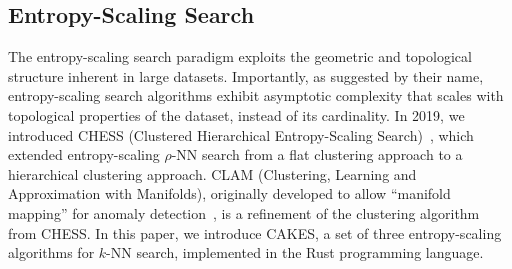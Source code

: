 \subsection{Entropy-Scaling Search}
\label{sec:intoduction:entropy-scaling-search}

The entropy-scaling search paradigm exploits the geometric and topological structure inherent in large datasets.
Importantly, as suggested by their name, entropy-scaling search algorithms exhibit asymptotic complexity that scales with topological properties of the dataset, instead of its cardinality.
In 2019, we introduced CHESS (Clustered Hierarchical Entropy-Scaling Search)~\cite{ishaq2019clustered}, which extended entropy-scaling $\rho$-NN search from a flat clustering approach to a hierarchical clustering approach.
CLAM (Clustering, Learning and Approximation with Manifolds), originally developed to allow ``manifold mapping'' for anomaly detection~\cite{ishaq2021clustered}, is a refinement of the clustering algorithm from CHESS.
In this paper, we introduce CAKES, a set of three entropy-scaling algorithms for $k$-NN search, implemented in the Rust programming language.
